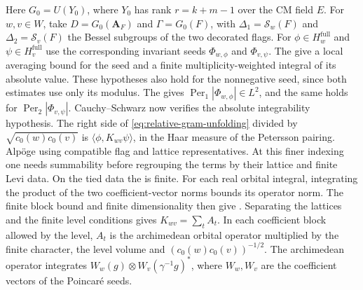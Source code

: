 Here \(G_0=U(Y_0)\), where \(Y_0\) has rank \(r=k+m-1\) over the CM
field \(E\). For \(w,v\in W\), take \(D=G_0(\mathbf A_F)\) and
\(\Gamma=G_0(F)\), with \(\Delta_1=\mathcal S_w(F)\) and
\(\Delta_2=\mathcal S_v(F)\) the Bessel subgroups of the two decorated
flags. For \(\phi\in H_w^{\mathrm{full}}\) and
\(\psi\in H_v^{\mathrm{full}}\) use the corresponding invariant seeds
\(\Phi_{w,\phi}\) and \(\Phi_{v,\psi}\).
The 
give a local averaging bound for the seed and a finite
multiplicity-weighted integral of its absolute value. These hypotheses
also hold for the nonnegative seed, since both estimates use only its
modulus. The
gives \(\operatorname{Per}_1|\Phi_{w,\phi}|\in L^2\), and the same
holds for \(\operatorname{Per}_2|\Phi_{v,\psi}|\).
Cauchy--Schwarz now verifies the absolute integrability hypothesis.
The right side of \eqref{eq:relative-gram-unfolding} divided by
\(\sqrt{c_0(w)c_0(v)}\) is \(\langle\phi,K_{wv}\psi\rangle\), in
the Haar measure of the Petersson pairing.
Alp\"oge
using compatible flag and lattice representatives. At this finer
indexing one needs summability before regrouping the terms by their
lattice and finite Levi data. On the tied data the
is finite. For each real orbital integral, integrating the product of
the two coefficient-vector norms bounds its operator norm. The finite
block bound and finite dimensionality then give
.
Separating the lattices and the finite level conditions gives
\(K_{wv}=\sum_t A_t\). In each
coefficient block allowed by the level, \(A_t\) is the archimedean
orbital operator multiplied by the finite character, the level volume
and \((c_0(w)c_0(v))^{-1/2}\). The archimedean operator integrates
\(W_w(g)\otimes W_v(\gamma^{-1}g)^*\), where \(W_w,W_v\) are the
coefficient vectors of the Poincar\'e seeds.

